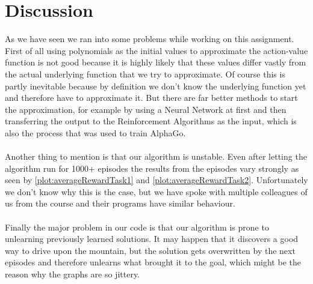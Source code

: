 \documentclass{article}
\begin{document}
	\section{Discussion}
	As we have seen we ran into some problems while working on this assignment. First of all using polynomials as the initial values to approximate the action-value function is not good because it is highly likely that these values differ vastly from the actual underlying function that we try to approximate. Of course this is partly inevitable because by definition we don't know the underlying function yet and therefore have to approximate it. But there are far better methods to start the approximation, for example by using a Neural Network at first and then transferring the output to the Reinforcement Algorithms as the input, which is also the process that was used to train AlphaGo. \\
	\\
	Another thing to mention is that our algorithm is unstable. Even after letting the algorithm run for 1000+ episodes the results from the episodes vary strongly as seen by \autoref{plot:averageRewardTask1} and \autoref{plot:averageRewardTask2}. Unfortunately we don't know why this is the case, but we have spoke with multiple colleagues of us from the course and their programs have similar behaviour. \\
	\\
	Finally the major problem in our code is that our algorithm is prone to unlearning previously learned solutions. It may happen that it discovers a good way to drive upon the mountain, but the solution gets overwritten by the next episodes and therefore unlearns what brought it to the goal, which might be the reason why the graphs are so jittery. 
	
	
	
	
	
	
\end{document}
